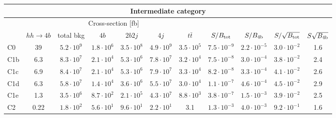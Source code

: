 \begin{tabular}{|l|cc|cccc|cccc|}
  \hline
\multicolumn{11}{|c|}{Intermediate category}\\
\hline
&  \multicolumn{6}{c|}{Cross-section [fb]} &  &  & &  \\
   &  $hh\to 4b$ &  total bkg  &   $4b$    &  $2b2j$   &   $4j$    &
$t\bar{t}$ &
$S/B_{\rm tot}$ & $S/B_{\rm 4b}$ & $S/\sqrt{B_{\rm tot}}$ & $S\sqrt{B_{\rm 4b}}$ \\
  \hline
  \hline
 C0      & 39  &   $5.2\cdot 10^9$   & $1.8\cdot 10^6$ & $3.5\cdot 10^8$ & $4.9\cdot 10^9$ & $3.5\cdot 10^5$ &  $7.5\cdot 10^{-9}$   & $2.2\cdot 10^{-5}$   &   $3.0\cdot 10^{-2}$   & 1.6  \\
  C1b     & 6.3  &  $ 8.3\cdot 10^7$   & $2.1\cdot 10^4$ & $5.3\cdot 10^6$ & $7.8\cdot 10^7$ & $3.2\cdot 10^4$ & $7.5\cdot 10^{-8}$   & $3.0\cdot 10^{-4}$  &   $3.8\cdot 10^{-2}$   & 2.4 \\
 C1c     & 6.9  &   $8.4\cdot 10^7$   & $2.1\cdot 10^4$ & $5.3\cdot 10^6$ & $7.9\cdot 10^7$ & $3.3\cdot 10^4$ &  $8.2\cdot 10^{-8}$   & $3.3\cdot 10^{-4}$ &   $4.1\cdot 10^{-2}$   & 2.6 \\
 C1d     & 6.3  &   $5.8\cdot 10^7$   & $1.4\cdot 10^4$ & $3.6\cdot 10^6$ & $5.5\cdot 10^7$ & $3.0\cdot 10^4$ &  $1.1\cdot 10^{-7}$   & $4.6\cdot 10^{-4}$ &   $4.5\cdot 10^{-2}$   & 2.9\\
 C1e     & 1.3  &   $3.5\cdot 10^6$   & $8.7\cdot 10^2$ & $2.1\cdot 10^5$ & $4.3\cdot 10^7$ & $8.8\cdot 10^3$ &  $3.8\cdot 10^{-7}$   & $1.5\cdot 10^{-3}$  &   $3.9\cdot 10^{-2}$   & 2.5\\
 C2      & 0.22  &   $1.8\cdot 10^2$   & $5.6\cdot 10^1$ & $9.6\cdot 10^1$ & $2.2\cdot 10^1$ & 3.1 & $1.3\cdot 10^{-3}$   & $4.0\cdot 10^{-3}$  &   $9.2\cdot 10^{-1}$   & 1.6 \\
\hline
\end{tabular}
